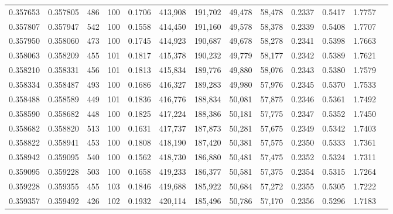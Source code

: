 \begin{tabular}{rrrrrrrrrrrrr}
0.357653 & 0.357805 &   486 & 100 &                                     0.1706 & 413,908 & 191,702 &  49,478 &  58,478 & 0.2337 & 0.5417 & 1.7757 \\
0.357807 & 0.357947 &   542 & 100 &                                     0.1558 & 414,450 & 191,160 &  49,578 &  58,378 & 0.2339 & 0.5408 & 1.7707 \\
0.357950 & 0.358060 &   473 & 100 &                                     0.1745 & 414,923 & 190,687 &  49,678 &  58,278 & 0.2341 & 0.5398 & 1.7663 \\
0.358063 & 0.358209 &   455 & 101 &                                     0.1817 & 415,378 & 190,232 &  49,779 &  58,177 & 0.2342 & 0.5389 & 1.7621 \\
0.358210 & 0.358331 &   456 & 101 &                                     0.1813 & 415,834 & 189,776 &  49,880 &  58,076 & 0.2343 & 0.5380 & 1.7579 \\
0.358334 & 0.358487 &   493 & 100 &                                     0.1686 & 416,327 & 189,283 &  49,980 &  57,976 & 0.2345 & 0.5370 & 1.7533 \\
0.358488 & 0.358589 &   449 & 101 &                                     0.1836 & 416,776 & 188,834 &  50,081 &  57,875 & 0.2346 & 0.5361 & 1.7492 \\
0.358590 & 0.358682 &   448 & 100 &                                     0.1825 & 417,224 & 188,386 &  50,181 &  57,775 & 0.2347 & 0.5352 & 1.7450 \\
0.358682 & 0.358820 &   513 & 100 &                                     0.1631 & 417,737 & 187,873 &  50,281 &  57,675 & 0.2349 & 0.5342 & 1.7403 \\
0.358822 & 0.358941 &   453 & 100 &                                     0.1808 & 418,190 & 187,420 &  50,381 &  57,575 & 0.2350 & 0.5333 & 1.7361 \\
0.358942 & 0.359095 &   540 & 100 &                                     0.1562 & 418,730 & 186,880 &  50,481 &  57,475 & 0.2352 & 0.5324 & 1.7311 \\
0.359095 & 0.359228 &   503 & 100 &                                     0.1658 & 419,233 & 186,377 &  50,581 &  57,375 & 0.2354 & 0.5315 & 1.7264 \\
0.359228 & 0.359355 &   455 & 103 &                                     0.1846 & 419,688 & 185,922 &  50,684 &  57,272 & 0.2355 & 0.5305 & 1.7222 \\
0.359357 & 0.359492 &   426 & 102 &                                     0.1932 & 420,114 & 185,496 &  50,786 &  57,170 & 0.2356 & 0.5296 & 1.7183 \\

\end{tabular}
